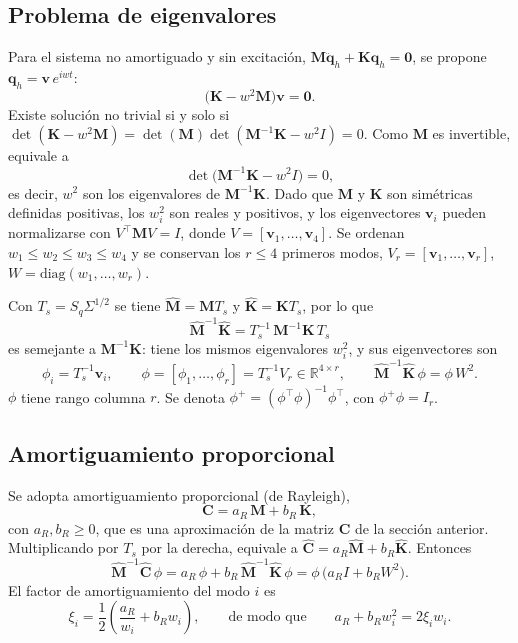 \subsection{Problema de eigenvalores}

Para el sistema no amortiguado y sin excitación, $\mathbf M\ddot{\mathbf q}_h+\mathbf K\mathbf q_h=\mathbf 0$, se propone $\mathbf q_h=\mathbf v\,e^{iwt}$:
\[
\big(\mathbf K-w^2\mathbf M\big)\mathbf v=\mathbf 0 .
\]
Existe solución no trivial si y solo si $\det(\mathbf K-w^2\mathbf M)=\det(\mathbf M)\det(\mathbf M^{-1}\mathbf K-w^2I)=0$.
 Como $\mathbf M$ es invertible, equivale a
\[
\det\big(\mathbf M^{-1}\mathbf K-w^2I\big)=0,
\]
es decir, $w^2$ son los eigenvalores de $\mathbf M^{-1}\mathbf K$. Dado que $\mathbf M$ y $\mathbf K$ son simétricas definidas
 positivas, los $w_i^2$ son reales y positivos, y los eigenvectores $\mathbf v_i$ pueden normalizarse con $V^\top\mathbf MV=I$, 
 donde $V=[\mathbf v_1,\ldots,\mathbf v_4]$. Se ordenan $w_1\le w_2\le w_3\le w_4$ y se conservan los $r\le4$ primeros modos, 
 $V_r=[\mathbf v_1,\ldots,\mathbf v_r]$, $W=\mathrm{diag}(w_1,\ldots,w_r)$.

Con $T_s=S_q\Sigma^{1/2}$ se tiene $\hat{\mathbf M}=\mathbf MT_s$ y $\hat{\mathbf K}=\mathbf KT_s$, por lo que
\[
\hat{\mathbf M}^{-1}\hat{\mathbf K}=T_s^{-1}\,\mathbf M^{-1}\mathbf K\,T_s
\]
es semejante a $\mathbf M^{-1}\mathbf K$: tiene los mismos eigenvalores $w_i^2$, y sus eigenvectores son
\[
\phi_i=T_s^{-1}\mathbf v_i,\qquad \phi=[\phi_1,\ldots,\phi_r]=T_s^{-1}V_r\in\mathbb R^{4\times r},
\qquad
\hat{\mathbf M}^{-1}\hat{\mathbf K}\,\phi=\phi\,W^2 .
\]
$\phi$ tiene rango columna $r$. Se denota $\phi^{+}=(\phi^\top\phi)^{-1}\phi^\top$, con $\phi^{+}\phi=I_r$.

\subsection{Amortiguamiento proporcional}

Se adopta amortiguamiento proporcional (de Rayleigh),
\[
\mathbf C=a_R\,\mathbf M+b_R\,\mathbf K,
\]
con $a_R,b_R\ge0$, que es una aproximación de la matriz $\mathbf C$ de la sección anterior. Multiplicando por $T_s$ por la
 derecha, equivale a $\hat{\mathbf C}=a_R\hat{\mathbf M}+b_R\hat{\mathbf K}$. Entonces
\[
\hat{\mathbf M}^{-1}\hat{\mathbf C}\,\phi=a_R\,\phi+b_R\,\hat{\mathbf M}^{-1}\hat{\mathbf K}\,\phi=\phi\,\big(a_RI+b_RW^2\big).
\]
El factor de amortiguamiento del modo $i$ es
\[
\xi_i=\frac12\left(\frac{a_R}{w_i}+b_Rw_i\right),\qquad\text{de modo que}\qquad a_R+b_Rw_i^2=2\xi_iw_i .
\]

